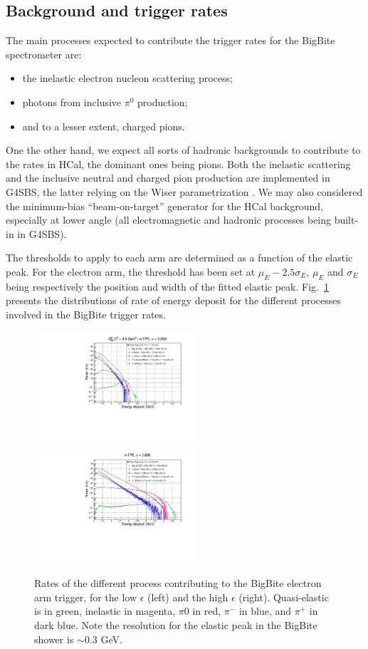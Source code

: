 \subsection{Background and trigger rates}

The main processes expected to contribute the trigger rates for the BigBite spectrometer are:
%
\begin{itemize}
\item{the inelastic electron nucleon scattering process;}
\item{photons from inclusive $\pi^0$ production;}
\item{and to a lesser extent, charged pions.}
\end{itemize}
%
One the other hand, we expect all sorts of hadronic backgrounds to contribute to the rates in HCal, the dominant ones being pions.
Both the inelastic scattering and the inclusive neutral and charged pion production are implemented in G4SBS, the latter relying on the Wiser parametrization \cite{wiser}.
We may also considered the minimum-bias ``beam-on-target'' generator for the HCal background, especially at lower angle (all electromagnetic and hadronic processes being built-in in G4SBS).

The thresholds to apply to each arm are determined as a function of the elastic peak.
For the electron arm, the threshold has been set at $\mu_E - 2.5 \sigma_E$,  $\mu_E$ and $\sigma_E$ being respectively the position and width of the fitted elastic peak. 
Fig.~\ref{fig:BBRates} presents the distributions of rate of energy deposit for the different processes involved in the BigBite trigger rates. 
%
\begin{figure}[!h]
  \begin{center}
    \includegraphics[width=6cm]{Plots/BBECalRates_gen-tpe_le.pdf}
    \includegraphics[width=6cm]{Plots/BBECalRates_gen-tpe_he.pdf}
    \caption{Rates of the different process contributing to the BigBite electron arm trigger, for the low $\epsilon$ (left) and the high $\epsilon$ (right). Quasi-elastic is in green, inelastic in magenta, $\pi0$ in red, $\pi^-$ in blue, and $\pi^+$ in dark blue. Note the resolution for the elastic peak in the BigBite shower is $\sim0.3$ GeV.}
    \label{fig:BBRates}
  \end{center}
\end{figure}
%

